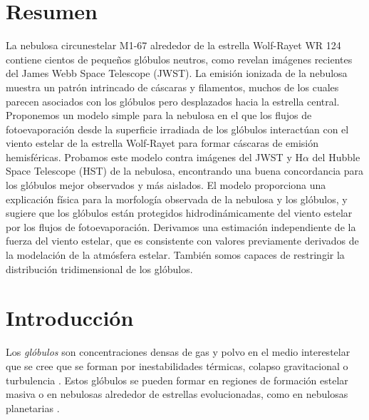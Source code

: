 \documentclass{book}
\begin{document}

\chapter*{Resumen}

La nebulosa circunestelar M1-67 alrededor de la estrella Wolf-Rayet WR 124 contiene cientos de pequeños glóbulos neutros, como revelan imágenes recientes del  James Webb Space Telescope (JWST). La emisión ionizada de la nebulosa muestra un patrón intrincado de cáscaras y filamentos, muchos de los cuales parecen asociados con los glóbulos pero desplazados hacia la estrella central. Proponemos un modelo simple para la nebulosa en el que los flujos de fotoevaporación desde la superficie irradiada de los glóbulos interactúan con el viento estelar de la estrella Wolf-Rayet para formar cáscaras de emisión hemisféricas. Probamos este modelo contra imágenes del JWST y H$\alpha$ del Hubble Space Telescope (HST) de la nebulosa, encontrando una buena concordancia para los glóbulos mejor observados y más aislados. El modelo proporciona una explicación física para la morfología observada de la nebulosa y los glóbulos, y sugiere que los glóbulos están protegidos hidrodinámicamente del viento estelar por los flujos de fotoevaporación. Derivamos una estimación independiente de la fuerza del viento estelar, que es consistente con valores previamente derivados de la modelación de la atmósfera estelar. También somos capaces de restringir la distribución tridimensional de los glóbulos.

\newpage

\tableofcontents

\newpage

\chapter{Introducción}\label{Capitulo 1:introduccion}

Los \textit{glóbulos} son concentraciones densas de gas y polvo en el medio interestelar que se cree que se forman por inestabilidades térmicas, colapso gravitacional o turbulencia \citep{Ballesteros:2011,Padoan:2002}. Estos glóbulos se pueden formar en regiones de formación estelar masiva o en nebulosas alrededor de estrellas evolucionadas, como en nebulosas planetarias \citep{O'Dell:2007}.
\end{document}
